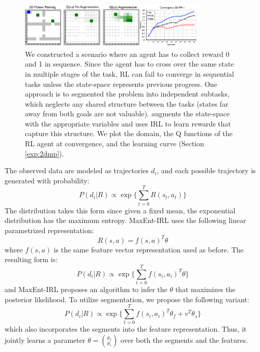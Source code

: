 \begin{figure}[t]
\centering
 \includegraphics[width=0.8\textwidth]{exp/gw-easy-1abc.png}
 \caption{We constructed a scenario where an agent has to collect reward 0 and 1 in sequence. Since the agent has to cross over the same state in multiple stages of the task, RL can fail to converge in sequential tasks unless the state-space represents previous progress. 
 One approach is to segmented the problem into independent subtasks, which neglects any shared structure between the tasks (states far away from both goals are not valuable).
 \hirl augments the state-space with the appropriate variables and uses IRL to learn rewards that capture this structure. We plot the domain, the Q functions of the RL agent at convergence, and the learning curve (Section \ref{exp:2dmp}).  \label{exp:gweasy1}}
\end{figure}

The observed data are modeled as trajectories $d_i$, and each possible trajectory is generated with probability:
\[
P(d_i | R) \propto \exp \{ \sum_{t=0}^T R(s_t,a_t) \}
\]
The distribution takes this form since given a fixed mean, the exponential distribution has the maximum entropy.
 MaxEnt-IRL uses the following linear parametrized representation:
\[
R(s,a) = f(s,a)^T \theta
\]
where $f(s,a)$ is the same feature vector representation used as before. 
The resulting form is:
\[
P(d_i | R) \propto \exp \{ \sum_{t=0}^T f(s_i,a_i)^T \theta \}
\]
and MaxEnt-IRL proposes an algorithm to infer the $\theta$ that maximizes the posterior likelihood.
To utilize segmentation, we propose the following variant:
\[
P(d_i | R) \propto \exp \{ \sum_{t=0}^T f(s_i,a_i)^T \theta_f  + v^T \theta_s\}
\]
which also incorporates the segments into the feature representation.
Thus, it jointly learns a parameter $\theta = \binom{\theta_f}{\theta_s}$ over both the segments and the features.





